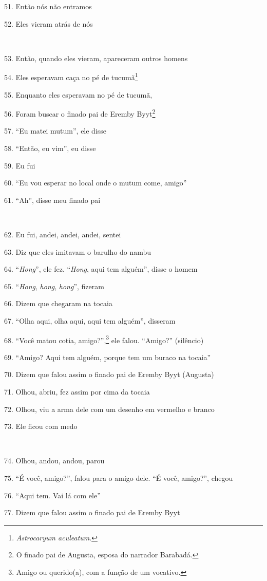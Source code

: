51. Então nós não entramos

52. Eles vieram atrás de nós

~

53. Então, quando eles vieram, apareceram outros homens

54. Eles esperavam caça no pé de tucumã\footnote{\emph{Astrocaryum
  aculeatum}.}

55. Enquanto eles esperavam no pé de tucumã,

56. Foram buscar o finado pai de Eremby Byyt\footnote{O finado pai de
  Augusta, esposa do narrador Barabadá.}

57. ``Eu matei mutum'', ele disse

58. ``Então, eu vim'', eu disse

59. Eu fui

60. ``Eu vou esperar no local onde o mutum come, amigo''

61. ``Ah'', disse meu finado pai

~

62. Eu fui, andei, andei, andei, sentei

63. Diz que eles imitavam o barulho do nambu

64. ``\emph{Hong}'', ele fez. ``\emph{Hong}, aqui tem alguém'', disse o homem

65. ``\emph{Hong}, \emph{hong}, \emph{hong}'', fizeram

66. Dizem que chegaram na tocaia

67. ``Olha aqui, olha aqui, aqui tem alguém'', disseram

68. ``Você matou cotia, amigo?'',\footnote{Amigo ou querido(a), com a função
  de um vocativo.} ele falou. ``Amigo?'' (silêncio)

69. ``Amigo? Aqui tem alguém, porque tem um buraco na tocaia''

70. Dizem que falou assim o finado pai de Eremby Byyt (Augusta)

71. Olhou, abriu, fez assim por cima da tocaia

72. Olhou, viu a arma dele com um desenho em vermelho e branco

73. Ele ficou com medo

~

74. Olhou, andou, andou, parou

75. ``É você, amigo?'', falou para o amigo dele. ``É você, amigo?'', chegou

76. ``Aqui tem.  Vai lá com ele''

77. Dizem que falou assim o finado pai de Eremby Byyt

